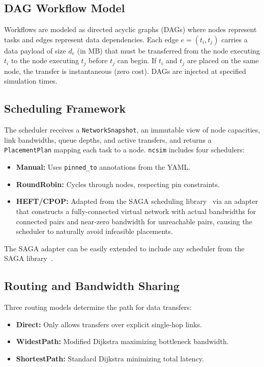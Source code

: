 \documentclass[conference]{IEEEtran}
\newcommand{\ncsim}{\texttt{ncsim}}
\begin{document}
\subsection{DAG Workflow Model}

Workflows are modeled as directed acyclic graphs (DAGs) where nodes represent
tasks and edges represent data dependencies.  Each edge $e = (t_i, t_j)$
carries a data payload of size $d_e$ (in MB) that must be transferred from
the node executing $t_i$ to the node executing $t_j$ before $t_j$ can begin.
If $t_i$ and $t_j$ are placed on the same node, the transfer is
instantaneous (zero cost).  DAGs are injected at specified simulation times.

\subsection{Scheduling Framework}

The scheduler receives a \texttt{NetworkSnapshot}, an immutable view of
node capacities, link bandwidths, queue depths, and active transfers, and
returns a \texttt{PlacementPlan} mapping each task to a node.  \ncsim{}
includes four schedulers:

\begin{itemize}[itemsep=1pt,leftmargin=*]
\item \textbf{Manual:} Uses \texttt{pinned\_to} annotations from the YAML.
\item \textbf{RoundRobin:} Cycles through nodes, respecting pin constraints.
\item \textbf{HEFT/CPOP:} Adapted from the SAGA scheduling library~\cite{heft}
  via an adapter that constructs a fully-connected virtual network with actual
  bandwidths for connected pairs and near-zero bandwidth for unreachable
  pairs, causing the scheduler to naturally avoid infeasible placements.
\end{itemize}
\noindent The SAGA adapter can be easily extended to include any scheduler
from the SAGA library~\cite{SAGARepo}.

\subsection{Routing and Bandwidth Sharing}

Three routing models determine the path for data transfers:

\begin{itemize}[itemsep=1pt,leftmargin=*]
\item \textbf{Direct:} Only allows transfers over explicit single-hop links.
\item \textbf{WidestPath:} Modified Dijkstra maximizing bottleneck bandwidth.
\item \textbf{ShortestPath:} Standard Dijkstra minimizing total latency.
\end{itemize}
\end{document}
